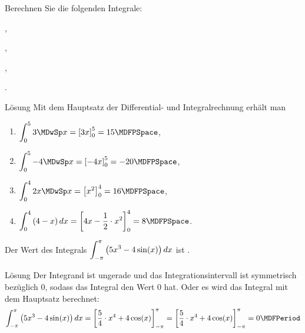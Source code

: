 \begin{MExercises}
\begin{MExercise}
Berechnen Sie die folgenden Integrale:
\begin{MExerciseItems}
\item{,}
\item{,}
\item{,}
\item{.}
\end{MExerciseItems}
\begin{MHint}{Lösung}
Mit dem Hauptsatz der Differential- und Integralrechnung erhält man
\begin{enumerate}
\item $\displaystyle \int_{0}^{5} 3 \MDwSp x %
= \left[ 3 x \right]_0^5 = 15\MDFPSpace$,
%
\item $\displaystyle \int_{0}^{5} -4 \MDwSp x %
= \left[ -4 x \right]_0^5 = -20\MDFPSpace$,
%
\item $\displaystyle \int_{0}^{4} 2 x \MDwSp x %
= \left[ x^2 \right]_0^4 = 16\MDFPSpace$,
%
\item $\displaystyle \int_{0}^{4} \left(4 - x\right) \MD x %
= \left[ 4 x - \frac{1}{2} \cdot x^2 \right]_0^4 = 8\MDFPSpace$.
%
\end{enumerate}
\end{MHint}
\end{MExercise}


\begin{MExercise}
Der Wert des Integrals
$\displaystyle \int_{-\pi}^{\pi} \left(5 x^3 - 4 \sin(x)\right) d x$
ist .
\begin{MHint}{Lösung}
Der Integrand ist ungerade und das Integrationsintervall ist symmetrisch 
bezüglich $0$, sodass das Integral den Wert $0$ hat.
Oder es wird das Integral mit dem Hauptsatz berechnet:
\[
\int_{-\pi}^{\pi} \left(5 x^3 - 4 \sin(x)\right) \MD x %
= \left[ \frac{5}{4} \cdot x^4 + 4 \cos(x) \right]_{-\pi}^{\pi} %
= \left[ \frac{5}{4} \cdot x^4 + 4 \cos(x) \right]_{-\pi}^{\pi} %
= 0\MDFPeriod %
\]
\end{MHint}
\end{MExercise}



\end{MExercises}
